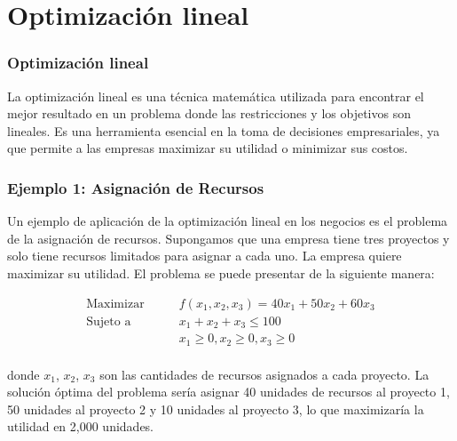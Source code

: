 \documentclass{beamer}
\begin{document}
\section{Optimización lineal}


\begin{frame}
    \frametitle{Optimización lineal}
    
    La optimización lineal es una técnica matemática utilizada para encontrar el mejor resultado en un problema donde las restricciones y los objetivos son lineales. Es una herramienta esencial en la toma de decisiones empresariales, ya que permite a las empresas maximizar su utilidad o minimizar sus costos.
    
\end{frame}

\begin{frame}
    \frametitle{Ejemplo 1: Asignación de Recursos}
    
    Un ejemplo de aplicación de la optimización lineal en los negocios es el problema de la asignación de recursos. Supongamos que una empresa tiene tres proyectos y solo tiene recursos limitados para asignar a cada uno. La empresa quiere maximizar su utilidad. El problema se puede presentar de la siguiente manera:
    
    \begin{align*}
    \text{Maximizar} \qquad & f(x_1, x_2, x_3) = 40x_1 + 50x_2 + 60x_3 \\
    \text{Sujeto a} \qquad & x_1 + x_2 + x_3 \leq 100 \\
    & x_1 \geq 0, x_2 \geq 0, x_3 \geq 0 \\
    \end{align*}
    
    donde $x_1$, $x_2$, $x_3$ son las cantidades de recursos asignados a cada proyecto.
    La solución óptima del problema sería asignar 40 unidades de recursos al proyecto 1, 50 unidades al proyecto 2 y 10 unidades al proyecto 3, lo que maximizaría la utilidad en 2,000 unidades.
    
    \end{frame}
    
\end{document}
